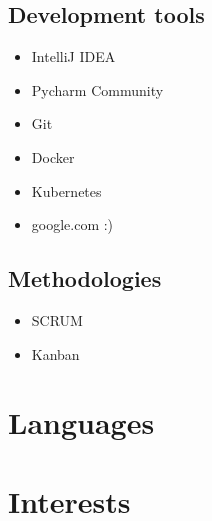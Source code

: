 \documentclass[12pt,a4paper,sans]{moderncv}        %
\begin{document}
\subsection{Development tools}
\vspace{-10pt}
\begin{multicols}{2}
\begin{itemize}\setlength{\itemsep}{-5pt}%
\item IntelliJ IDEA
\item Pycharm Community
\item Git 
\item Docker
\item Kubernetes
\item google.com :)
\end{itemize}
\end{multicols}

\vspace{-10pt}

\subsection{Methodologies}
\vspace{-10pt}
\begin{multicols}{2}
\begin{itemize}\setlength{\itemsep}{-5pt}%
\item SCRUM
\item Kanban 
\end{itemize}
\end{multicols}

\vspace{-10pt}

\section{Languages}
\vspace{-10pt}

\section{Interests}

\end{document}
